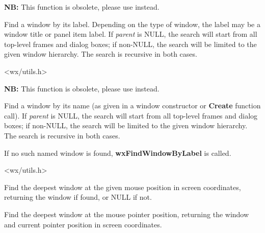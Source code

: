 
{\bf NB:} This function is obsolete, please use
 instead.

Find a window by its label. Depending on the type of window, the label may be a window title
or panel item label. If {\it parent} is NULL, the search will start from all top-level
frames and dialog boxes; if non-NULL, the search will be limited to the given window hierarchy.
The search is recursive in both cases.


<wx/utils.h>


\label{wxfindwindowbyname}


{\bf NB:} This function is obsolete, please use
 instead.

Find a window by its name (as given in a window constructor or {\bf Create} function call).
If {\it parent} is NULL, the search will start from all top-level
frames and dialog boxes; if non-NULL, the search will be limited to the given window hierarchy.
The search is recursive in both cases.

If no such named window is found, {\bf wxFindWindowByLabel} is called.


<wx/utils.h>


\label{wxfindwindowatpoint}


Find the deepest window at the given mouse position in screen coordinates,
returning the window if found, or NULL if not.


\label{wxfindwindowatpointer}


Find the deepest window at the mouse pointer position, returning the window
and current pointer position in screen coordinates.


\label{wxgetactivewindow}

